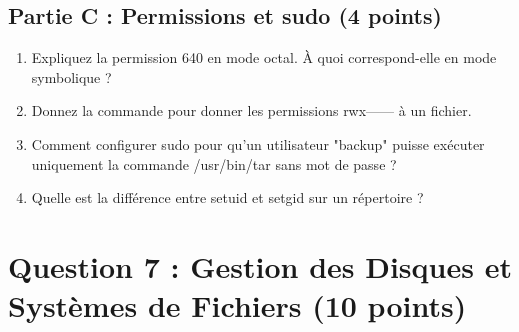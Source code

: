 \documentclass[12pt,a4paper]{article}
\begin{document}
\begin{questionbox}
\subsection*{Partie C : Permissions et sudo (4 points)}
\begin{enumerate}[label=\alph*)]
    \item Expliquez la permission 640 en mode octal. À quoi correspond-elle en mode symbolique ?
    \item Donnez la commande pour donner les permissions rwx------ à un fichier.
    \item Comment configurer sudo pour qu'un utilisateur "backup" puisse exécuter uniquement la commande /usr/bin/tar sans mot de passe ?
    \item Quelle est la différence entre setuid et setgid sur un répertoire ?
\end{enumerate}
\end{questionbox}

\newpage


\section{Question 7 : Gestion des Disques et Systèmes de Fichiers (10 points)}
\end{document}
